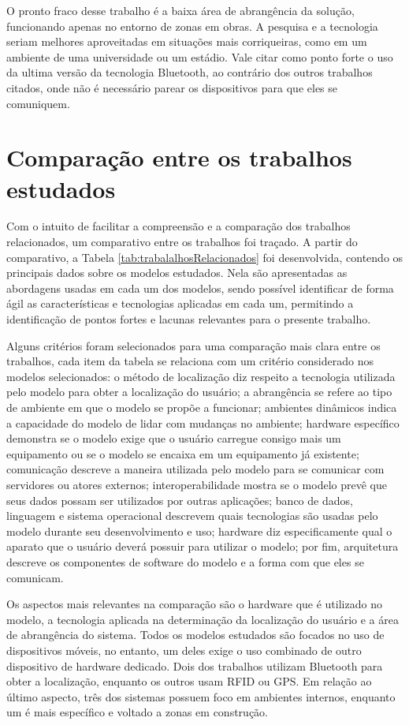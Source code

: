 \documentclass[english,brazilian]{UNISINOSmonografia}
\begin{document}
O pronto fraco desse trabalho é a baixa área de abrangência da solução, funcionando apenas no entorno de zonas em obras.
A pesquisa e a tecnologia seriam melhores aproveitadas em situações mais corriqueiras, como em um ambiente de uma universidade ou um estádio. Vale citar como ponto forte o uso da ultima versão da tecnologia Bluetooth, ao contrário dos outros trabalhos citados, onde não é necessário parear os dispositivos para que eles se comuniquem.

	\section{Comparação entre os trabalhos estudados}\label{comparacaoTrabs}

Com o intuito de facilitar a compreensão e a comparação dos trabalhos relacionados, um comparativo entre os trabalhos foi traçado. A partir do comparativo, a Tabela \ref{tab:trabalalhosRelacionados} foi desenvolvida, contendo os principais dados sobre os modelos estudados. Nela são apresentadas as abordagens usadas em cada um dos modelos, sendo possível identificar de forma ágil as características e tecnologias aplicadas em cada um, permitindo a identificação de pontos fortes e lacunas relevantes para o presente trabalho. 

Alguns critérios foram selecionados para uma comparação mais clara entre os trabalhos, cada item da tabela se relaciona com um critério considerado nos modelos selecionados: o método de localização diz respeito a tecnologia utilizada pelo modelo para obter a localização do usuário; a abrangência se refere ao tipo de ambiente em que o modelo se propõe a funcionar; ambientes dinâmicos indica a capacidade do modelo de lidar com mudanças no ambiente; hardware específico demonstra se o modelo exige que o usuário carregue consigo mais um equipamento ou se o modelo se encaixa em um equipamento já existente; comunicação descreve a maneira utilizada pelo modelo para se comunicar com servidores ou atores externos; interoperabilidade mostra se o modelo prevê que seus dados possam ser utilizados por outras aplicações; banco de dados, linguagem e sistema operacional descrevem quais tecnologias são usadas pelo modelo durante seu desenvolvimento e uso; hardware diz especificamente qual o aparato que o usuário deverá possuir para utilizar o modelo; por fim, arquitetura descreve os componentes de software do modelo e a forma com que eles se comunicam.

Os aspectos mais relevantes na comparação são o hardware que é utilizado no modelo, a tecnologia aplicada na determinação da localização do usuário e a área de abrangência do sistema. Todos os modelos estudados são focados no uso de dispositivos móveis, no entanto, um deles exige o uso combinado de outro dispositivo de hardware dedicado. Dois dos trabalhos utilizam Bluetooth para obter a localização, enquanto os outros usam RFID ou GPS. Em relação ao último aspecto, três dos sistemas possuem foco em ambientes internos, enquanto um é mais específico e voltado a zonas em construção.
\end{document}
